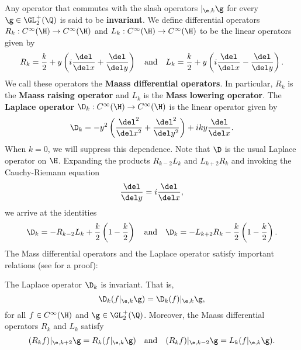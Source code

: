     Any operator that commutes with the slash operators $|_{\e,k}\g$ for every $\g \in \GL_{2}^{+}(\Q)$ is said to be \textbf{invariant}. We define differential operators $R_{k}:C^{\infty}(\H) \to C^{\infty}(\H)$ and $L_{k}:C^{\infty}(\H) \to C^{\infty}(\H)$ to be the linear operators given by
    \[
      R_{k} = \frac{k}{2}+y\left(i\frac{\del}{\del x}+\frac{\del}{\del y}\right) \quad \text{and} \quad L_{k} = \frac{k}{2}+y\left(i\frac{\del}{\del x}-\frac{\del}{\del y}\right).
    \]
    We call these operators the \textbf{Maass differential operators}. In particular, $R_{k}$ is the \textbf{Maass raising operator} and $L_{k}$ is the \textbf{Mass lowering operator}. The \textbf{Laplace operator} $\D_{k}:C^{\infty}(\H) \to C^{\infty}(\H)$ is the linear operator given by
    \[
      \D_{k} = -y^{2}\left(\frac{\del^{2}}{\del x^{2}}+\frac{\del^{2}}{\del y^{2}}\right)+iky\frac{\del}{\del x}.
    \]
    When $k = 0$, we will suppress this dependence. Note that $\D$ is the usual Laplace operator on $\H$. Expanding the products $R_{k-2}L_{k}$ and $L_{k+2}R_{k}$ and invoking the Cauchy-Riemann equation
    \[
      \frac{\del}{\del y} = i\frac{\del}{\del x},
    \]
    we arrive at the identities
    \[
      \D_{k} = -R_{k-2}L_{k}+\frac{k}{2}\left(1-\frac{k}{2}\right) \quad \text{and} \quad \D_{k} = -L_{k+2}R_{k}-\frac{k}{2}\left(1-\frac{k}{2}\right).
    \]
     The Mass differential operators and the Laplace operator satisfy important relations (see \cite{bumpautomorphic1997} for a proof):

    \begin{proposition}\label{prop:Laplace_is_invariant}
      The Laplace operator $\D_{k}$ is invariant. That is,
      \[
        \D_{k}(f|_{\e,k}\g) = \D_{k}(f)|_{\e,k}\g,
      \]
      for all $f \in C^{\infty}(\H)$ and $\g \in \GL_{2}^{+}(\Q)$. Moreover, the Maass differential operators $R_{k}$ and $L_{k}$ satisfy
      \[
        (R_{k}f)|_{\e,k+2}\g = R_{k}(f|_{\e,k}\g) \quad \text{and} \quad (R_{k}f)|_{\e,k-2}\g = L_{k}(f|_{\e,k}\g).
      \]
    \end{proposition}

